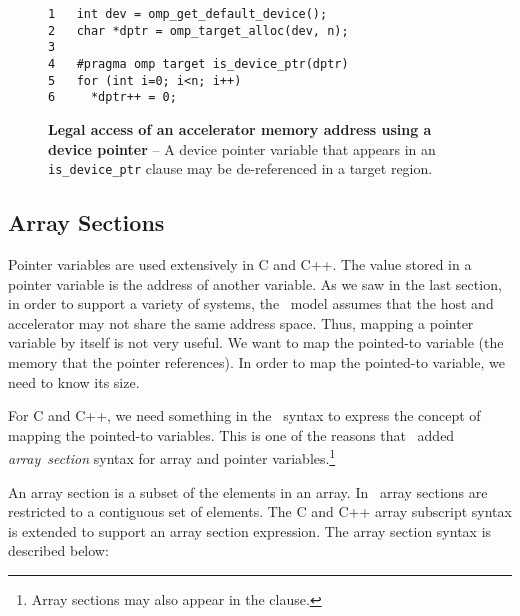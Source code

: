 \begin{figure*}[!tb]
\begin{verbatim}
1   int dev = omp_get_default_device();
2   char *dptr = omp_target_alloc(dev, n);
3 
4   #pragma omp target is_device_ptr(dptr)
5   for (int i=0; i<n; i++)
6     *dptr++ = 0;
\end{verbatim}
\caption{ \textbf {Legal access of an accelerator memory address using a device pointer} -- \small
          A device pointer variable that appears in an \texttt{is\_device\_ptr} clause 
          may be de-referenced in a target region.
        }
\label{figure:chapter6-devptr3}
\end{figure*}


\subsection{Array Sections}
\label{ssec:06.array-sections}

Pointer variables are used extensively in C and C++.  The value stored in a
pointer variable is the address of another variable.  As we saw in the last
section, in order to support a variety of systems, the \OMP\ model assumes that
the host and accelerator may not share the same address space. Thus, mapping a
pointer variable by itself is not very useful.  We want to map the pointed-to
variable (the memory that the pointer references). In order to map the
pointed-to variable, we need to know its size.

For C and C++, we need something in the \OMP\ syntax to express the concept of
mapping the pointed-to variables.  This is one of the reasons that \OMPfourzero\
added \emph{array}~\emph{section} syntax for array and pointer 
variables.\footnote{Array sections may also appear in the  clause.}

An array section is a subset of the elements in an array.  In \OMP\, array
sections are restricted to a contiguous set of elements.  The C and C++ array
subscript syntax is extended to support an array section expression.  The
array section syntax \code{base[\emph{offset}:\emph{length}]} is described below:

